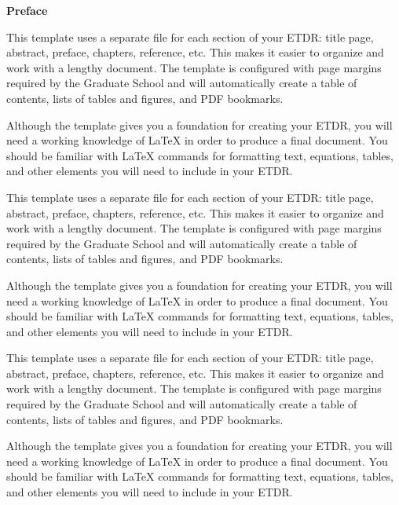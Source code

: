 
\newpage
\begin{center}
{\bf \Huge Preface}
\end{center}
\vspace{1cm}
\setlength{\baselineskip}{0.8cm}



This template uses a separate file for each section of your ETDR:
title page, abstract, preface, chapters, reference, etc.  This
makes it easier to organize and work with a lengthy document.  The
template is configured with page margins required by the Graduate
School and will automatically create a table of contents, lists of
tables and figures, and PDF bookmarks.

Although the template gives you a foundation for creating your
ETDR, you will need a working knowledge of LaTeX in order to
produce a final document.  You should be familiar with LaTeX
commands for formatting text, equations, tables, and other
elements you will need to include in your ETDR.

This template uses a separate file for each section of your ETDR:
title page, abstract, preface, chapters, reference, etc.  This
makes it easier to organize and work with a lengthy document.  The
template is configured with page margins required by the Graduate
School and will automatically create a table of contents, lists of
tables and figures, and PDF bookmarks.

Although the template gives you a foundation for creating your
ETDR, you will need a working knowledge of LaTeX in order to
produce a final document.  You should be familiar with LaTeX
commands for formatting text, equations, tables, and other
elements you will need to include in your ETDR.

This template uses a separate file for each section of your ETDR:
title page, abstract, preface, chapters, reference, etc.  This
makes it easier to organize and work with a lengthy document.  The
template is configured with page margins required by the Graduate
School and will automatically create a table of contents, lists of
tables and figures, and PDF bookmarks.

Although the template gives you a foundation for creating your
ETDR, you will need a working knowledge of LaTeX in order to
produce a final document.  You should be familiar with LaTeX
commands for formatting text, equations, tables, and other
elements you will need to include in your ETDR.

